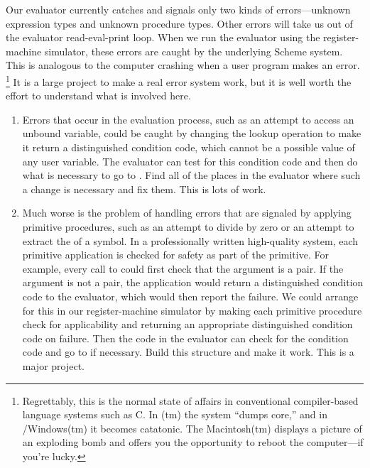 \begin{exercise}
	\label{Exercise 5.30}
	Our evaluator currently catches and signals only two kinds of errors---unknown expression types and unknown procedure types.
	Other errors will take us out of the evaluator read-eval-print loop.
	When we run the evaluator using the register-machine simulator, these errors are caught by the underlying Scheme system.
	This is analogous to the computer crashing when a user program makes an error.%
	\footnote{
		Regrettably, this is the normal state of affairs in conventional compiler-based language systems such as C.
		In (tm) the system “dumps core,” and in /Windows(tm) it becomes catatonic.
		The Macintosh(tm) displays a picture of an exploding bomb and offers you the opportunity to reboot the computer---if you’re lucky.
	}
	It is a large project to make a real error system work, but it is well worth the effort to understand what is involved here.
	\begin{enumerate}[label = \alph*., leftmargin = *]

		\item
			Errors that occur in the evaluation process, such as an attempt to access an unbound variable, could be caught by changing the lookup operation to make it return a distinguished condition code, which cannot be a possible value of any user variable.
			The evaluator can test for this condition code and then do what is necessary to go to .
			Find all of the places in the evaluator where such a change is necessary and fix them.
			This is lots of work.

		\item
			Much worse is the problem of handling errors that are signaled by applying primitive procedures, such as an attempt to divide by zero or an attempt to extract the  of a symbol.
			In a professionally written high-quality system, each primitive application is checked for safety as part of the primitive.
			For example, every call to  could first check that the argument is a pair.
			If the argument is not a pair, the application would return a distinguished condition code to the evaluator, which would then report the failure.
			We could arrange for this in our register-machine simulator by making each primitive procedure check for applicability and returning an appropriate distinguished condition code on failure.
			Then the  code in the evaluator can check for the condition code and go to  if necessary.
			Build this structure and make it work.
			This is a major project.

	\end{enumerate}
\end{exercise}
